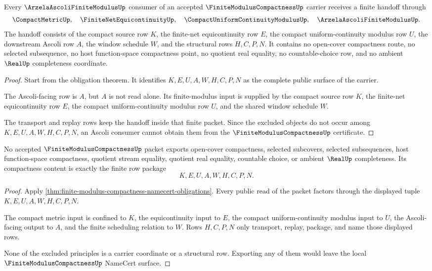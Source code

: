 \begin{theorem}
\label{thm:finite-modulus-compactness-ascoli-handoff}
Every $\ArzelaAscoliFiniteModulusUp$ consumer of an accepted $\FiniteModulusCompactnessUp$ carrier receives a finite handoff through
$$
\CompactMetricUp,\quad
\FiniteNetEquicontinuityUp,\quad
\CompactUniformContinuityModulusUp,\quad
\ArzelaAscoliFiniteModulusUp .
$$
The handoff consists of the compact source row $K$, the finite-net equicontinuity row $E$, the compact uniform-continuity modulus row $U$, the downstream Ascoli row $A$, the window schedule $W$, and the structural rows $H,C,P,N$. It contains no open-cover compactness route, no selected subsequence, no host function-space compactness point, no quotient real equality, no countable-choice row, and no ambient $\RealUp$ completeness coordinate.
\end{theorem}
\begin{proof}
Start from the obligation theorem. It identifies $K,E,U,A,W,H,C,P,N$ as the complete public surface of the carrier.

The Ascoli-facing row is $A$, but $A$ is not read alone. Its finite-modulus input is supplied by the compact source row $K$, the finite-net equicontinuity row $E$, the compact uniform-continuity modulus row $U$, and the shared window schedule $W$.

The transport and replay rows keep the handoff inside that finite packet. Since the excluded objects do not occur among $K,E,U,A,W,H,C,P,N$, an Ascoli consumer cannot obtain them from the $\FiniteModulusCompactnessUp$ certificate.
\end{proof}

\begin{theorem}
\label{thm:finite-modulus-compactness-nonescape}
No accepted $\FiniteModulusCompactnessUp$ packet exports open-cover compactness, selected subcovers, selected subsequences, host function-space compactness, quotient stream equality, quotient real equality, countable choice, or ambient $\RealUp$ completeness. Its compactness content is exactly the finite row package
$$
K,E,U,A,W,H,C,P,N .
$$
\end{theorem}
\begin{proof}
Apply \autoref{thm:finite-modulus-compactness-namecert-obligations}. Every public read of the packet factors through the displayed tuple $K,E,U,A,W,H,C,P,N$.

The compact metric input is confined to $K$, the equicontinuity input to $E$, the compact uniform-continuity modulus input to $U$, the Ascoli-facing output to $A$, and the finite scheduling relation to $W$. Rows $H,C,P,N$ only transport, replay, package, and name those displayed rows.

None of the excluded principles is a carrier coordinate or a structural row. Exporting any of them would leave the local $\FiniteModulusCompactnessUp$ NameCert surface.
\end{proof}

